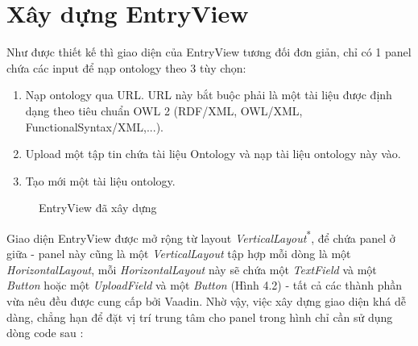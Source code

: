 \section{Xây dựng EntryView}
Như được thiết kế thì giao diện của EntryView tương đối đơn giản, chỉ có 1 panel chứa các input để nạp ontology theo 3 tùy chọn:
\begin{enumerate}
\item Nạp ontology qua URL. URL này bắt buộc phải là một tài liệu được định dạng theo tiêu chuẩn OWL 2 (RDF/XML, OWL/XML, FunctionalSyntax/XML,...).
\item Upload một tập tin chứa tài liệu Ontology và nạp tài liệu ontology này vào.
\item Tạo mới một tài liệu ontology.
\end{enumerate}
{\let\thefootnote\relax{}
}
\begin{figure}[h!]
	\centering
	\caption{EntryView đã xây dựng\label{overflow}}
\end{figure}
Giao diện EntryView được mở rộng từ layout \textit{VerticalLayout}\textsuperscript{*}, để chứa panel ở giữa - panel này cũng là một \textit{VerticalLayout} tập hợp mỗi dòng là một \textit{HorizontalLayout}, mỗi \textit{HorizontalLayout} này sẽ chứa một \textit{TextField} và một \textit{Button} hoặc một \textit{UploadField} và một \textit{Button} (Hình 4.2) - tất cả các thành phần vừa nêu đều được cung cấp bởi Vaadin. Nhờ vậy, việc xây dựng giao diện khá dễ dàng, chẳng hạn để đặt vị trí trung tâm cho panel trong hình chỉ cần sử dụng dòng code sau :
